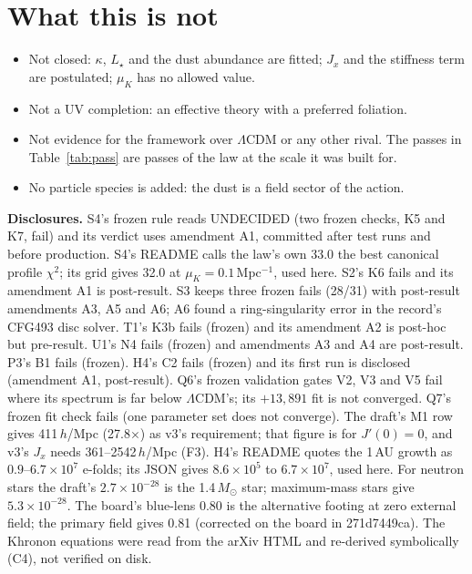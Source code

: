 \documentclass[10pt]{article}
\begin{document}
\section{What this is not}
\begin{itemize}
\item Not closed: $\kappa$, $L_\star$ and the dust abundance are fitted; $J_x$ and the stiffness term are postulated; $\mu_K$ has no allowed value.
\item Not a UV completion: an effective theory with a preferred foliation.
\item Not evidence for the framework over $\Lambda$CDM or any other rival. The passes in Table~\ref{tab:pass} are passes of the law at the scale it was built for.
\item No particle species is added: the dust is a field sector of the action.
\end{itemize}

\textbf{Disclosures.} S4's frozen rule reads UNDECIDED (two frozen checks, K5 and K7, fail) and its verdict uses amendment A1, committed after test runs and before production. S4's README calls the law's own 33.0 the best canonical profile $\chi^2$; its grid gives 32.0 at $\mu_K=0.1$\,Mpc$^{-1}$, used here. S2's K6 fails and its amendment A1 is post-result. S3 keeps three frozen fails (28/31) with post-result amendments A3, A5 and A6; A6 found a ring-singularity error in the record's CFG493 disc solver. T1's K3b fails (frozen) and its amendment A2 is post-hoc but pre-result. U1's N4 fails (frozen) and amendments A3 and A4 are post-result. P3's B1 fails (frozen). H4's C2 fails (frozen) and its first run is disclosed (amendment A1, post-result). Q6's frozen validation gates V2, V3 and V5 fail where its spectrum is far below $\Lambda$CDM's; its $+13{,}891$ fit is not converged. Q7's frozen fit check fails (one parameter set does not converge). The draft's M1 row gives 411\,$h$/Mpc (27.8$\times$) as v3's requirement; that figure is for $J'(0)=0$, and v3's $J_x$ needs 361--2542\,$h$/Mpc (F3). H4's README quotes the 1\,AU growth as $0.9$--$6.7\times10^{7}$ e-folds; its JSON gives $8.6\times10^{5}$ to $6.7\times10^{7}$, used here. For neutron stars the draft's $2.7\times10^{-28}$ is the 1.4\,$M_\odot$ star; maximum-mass stars give $5.3\times10^{-28}$. The board's blue-lens $0.80$ is the alternative footing at zero external field; the primary field gives 0.81 (corrected on the board in 271d7449ca). The Khronon equations were read from the arXiv HTML and re-derived symbolically (C4), not verified on disk.
\end{document}
